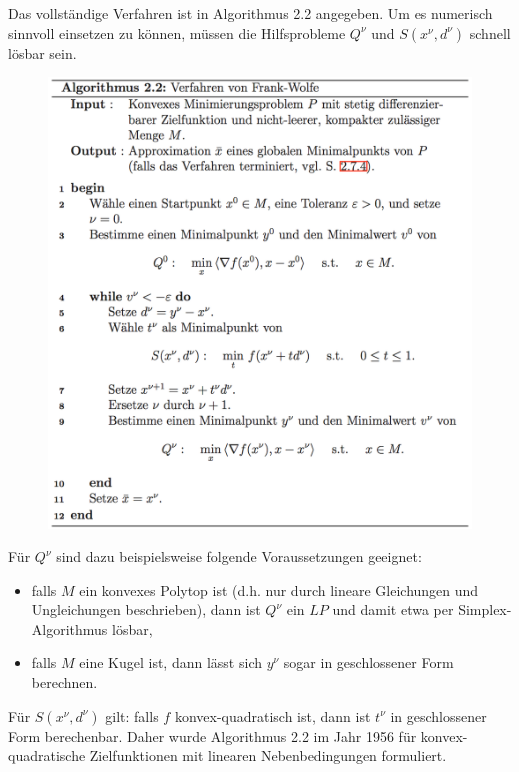 \documentclass[12pt]{extreport} %
\theoremstyle{named}
\theoremstyle{nnamed}
\theoremstyle{itshape}
\theoremstyle{normal}
\begin{document}
Das vollständige Verfahren ist in Algorithmus 2.2 angegeben. Um es numerisch sinnvoll einsetzen zu können, müssen die Hilfsprobleme $Q^\nu$ und $S(x^\nu, d^\nu)$ schnell lösbar sein.

\begin{figure}[h!] \centering
	\includegraphics[scale=0.55]{img/vl-alg-22}
\end{figure}

Für $Q^\nu$ sind dazu beispielsweise folgende Voraussetzungen geeignet:

\begin{itemize}
	\item falls $M$ ein konvexes Polytop ist (d.h. nur durch lineare Gleichungen und Ungleichungen beschrieben), dann ist $Q^\nu$ ein $LP$ und damit etwa per Simplex-Algorithmus lösbar, %
	\item falls $M$ eine Kugel ist, dann lässt sich $y^\nu$ sogar in geschlossener Form berechnen.
\end{itemize} %

Für $S(x^\nu, d^\nu)$ gilt: falls $f$ konvex-quadratisch ist, dann ist $t^\nu$ in geschlossener Form berechenbar. Daher wurde Algorithmus 2.2 im Jahr 1956 für konvex-quadratische Zielfunktionen mit linearen Nebenbedingungen formuliert.
\end{document}
